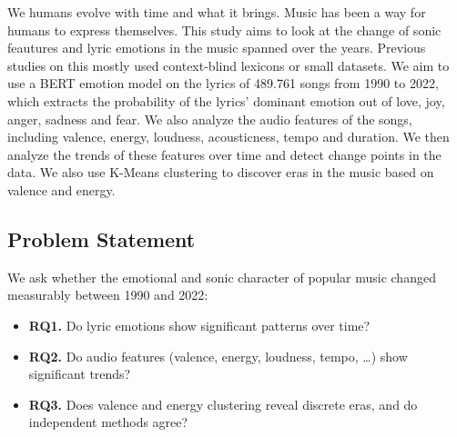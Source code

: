 \documentclass[conference]{IEEEtran}
\begin{document}
We humans evolve with time and what it brings. Music has been a way for humans to express themselves. This study aims to look at the change of sonic feautures and lyric emotions in the music spanned over the years. Previous studies on this mostly used context-blind lexicons or small datasets. We aim to use a BERT emotion model on the lyrics of 489.761 songs from 1990 to 2022, which extracts the probability of the lyrics' dominant emotion out of love, joy, anger, sadness and fear. We also analyze the audio features of the songs, including valence, energy, loudness, acousticness, tempo and duration. We then analyze the trends of these features over time and detect change points in the data. We also use K-Means clustering to discover eras in the music based on valence and energy.

\subsection{Problem Statement}
We ask whether the emotional and sonic character of popular music changed
measurably between 1990 and 2022:

\begin{itemize}
  \item \textbf{RQ1.} Do lyric emotions show significant patterns over time?
  \item \textbf{RQ2.} Do audio features (valence, energy, loudness, tempo,
        \dots) show significant trends?
  \item \textbf{RQ3.} Does valence and energy clustering reveal discrete eras, and do independent methods agree?
\end{itemize}

\end{document}

